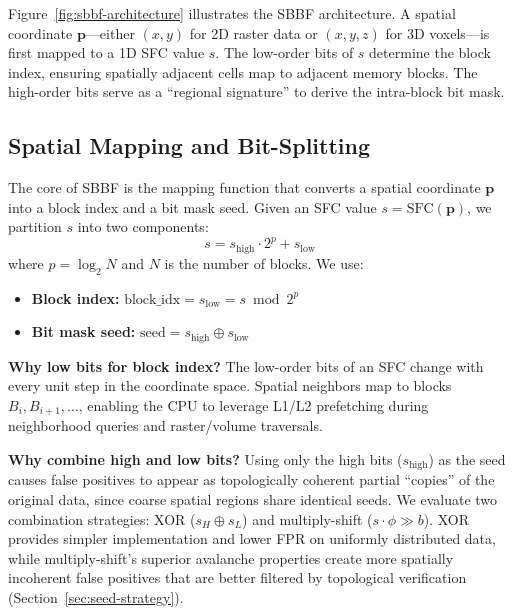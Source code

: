 \documentclass[conference,a4paper]{IEEEtran}
\begin{document}
Figure~\ref{fig:sbbf-architecture} illustrates the SBBF architecture. A spatial coordinate $\mathbf{p}$---either $(x, y)$ for 2D raster data or $(x, y, z)$ for 3D voxels---is first mapped to a 1D SFC value $s$. The low-order bits of $s$ determine the block index, ensuring spatially adjacent cells map to adjacent memory blocks. The high-order bits serve as a ``regional signature'' to derive the intra-block bit mask.


\subsection{Spatial Mapping and Bit-Splitting}
The core of SBBF is the mapping function that converts a spatial coordinate $\mathbf{p}$ into a block index and a bit mask seed. Given an SFC value $s = \text{SFC}(\mathbf{p})$, we partition $s$ into two components:
\begin{equation}
    s = s_{\text{high}} \cdot 2^p + s_{\text{low}}
\end{equation}
where $p = \log_2 N$ and $N$ is the number of blocks. We use:
\begin{itemize}
    \item \textbf{Block index:} $\text{block\_idx} = s_{\text{low}} = s \bmod 2^p$
    \item \textbf{Bit mask seed:} $\text{seed} = s_{\text{high}} \oplus s_{\text{low}}$
\end{itemize}

\textbf{Why low bits for block index?} The low-order bits of an SFC change with every unit step in the coordinate space. Spatial neighbors map to blocks $B_i, B_{i+1}, \ldots$, enabling the CPU to leverage L1/L2 prefetching during neighborhood queries and raster/volume traversals.

\textbf{Why combine high and low bits?} Using only the high bits ($s_{\text{high}}$) as the seed causes false positives to appear as topologically coherent partial ``copies'' of the original data, since coarse spatial regions share identical seeds. We evaluate two combination strategies: XOR ($s_H \oplus s_L$) and multiply-shift ($s \cdot \phi \gg b$). XOR provides simpler implementation and lower FPR on uniformly distributed data, while multiply-shift's superior avalanche properties create more spatially incoherent false positives that are better filtered by topological verification (Section~\ref{sec:seed-strategy}).
\end{document}
